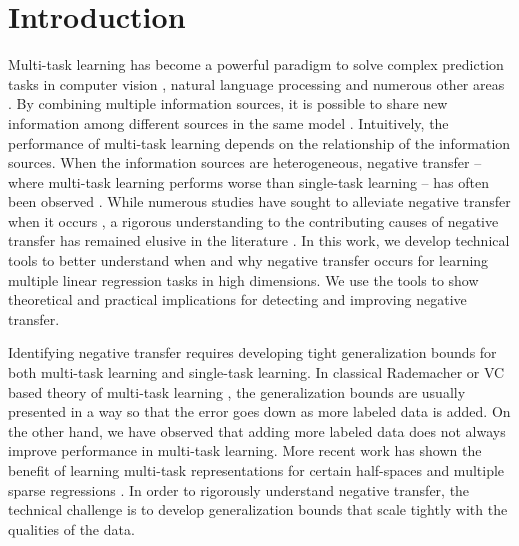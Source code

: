 \section{Introduction}

Multi-task learning has become a powerful paradigm to solve complex prediction tasks in computer vision \cite{chexnet17,ZSSGM18}, natural language processing \cite{GLUE,superglue} and numerous other areas \cite{ZY17}.
By combining multiple information sources, it is possible to share new information among different sources in the same model \cite{C97}.
Intuitively, the performance of multi-task learning depends on the relationship of the information sources.
When the information sources are heterogeneous, negative transfer -- where multi-task learning performs worse than single-task learning -- has often been observed \cite{AP16,BS17}.
While numerous studies have sought to alleviate negative transfer when it occurs \cite{YKGLHF20}, a rigorous understanding to the contributing causes of negative transfer has remained elusive in the literature \cite{R17}.
In this work, we develop technical tools to better understand when and why negative transfer occurs for learning multiple linear regression tasks in high dimensions. %
We use the tools to show theoretical and practical implications for detecting and improving negative transfer.

Identifying negative transfer requires developing tight generalization bounds for both multi-task learning and single-task learning.
In classical Rademacher or VC based theory of multi-task learning \cite{B00,AZ05,M06}, the generalization bounds are usually presented in a way so that the error goes down as more labeled data is added.
On the other hand, we have observed that adding more labeled data does not always improve performance in multi-task learning.
More recent work has shown the benefit of learning multi-task representations for certain half-spaces \cite{MPR16} and multiple sparse regressions \cite{LPTV09,LPVT11}.
In order to rigorously understand negative transfer, the technical challenge is to develop generalization bounds that scale tightly with the qualities of the data.

